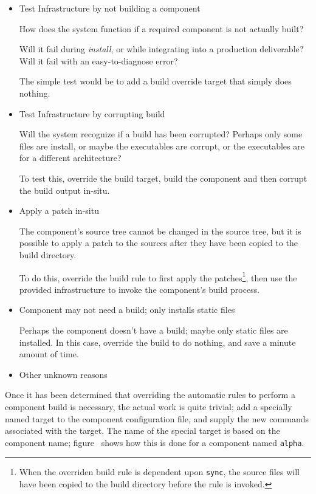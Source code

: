 \begin{itemize}
\item Test \bni Infrastructure by not building a component

  How does the \bni system function if a required component is not
  actually built?

  Will it fail during \emph{install}, or while integrating into a
  production deliverable?  Will it fail with an easy-to-diagnose
  error?

  The simple test would be to add a build override target that simply
  does nothing.

\item Test \bni Infrastructure by corrupting build

  Will the \bni system recognize if a build has been corrupted?
  Perhaps only some files are install, or maybe the executables are
  corrupt, or the executables are for a different architecture?

  To test this, override the build target, build the component and
  then corrupt the build output in-situ.

\item Apply a patch in-situ

  The component's source tree cannot be changed in the source tree,
  but it is possible to apply a patch to the sources after they have
  been copied to the build directory.

  To do this, override the build rule to first apply the
  patches\footnote{When the overriden build rule is dependent upon
    \texttt{sync}, the source files will have been copied to the build
    directory before the rule is invoked.}, then use the provided
  \lmsbw infrastructure to invoke the component's build process.

\item Component may not need a build; only installs static files

  Perhaps the component doesn't have a build; maybe only static files
  are installed.  In this case, override the build to do nothing, and
  save a minute amount of time.

\item Other unknown reasons
\end{itemize}

Once it has been determined that overriding the automatic rules to
perform a component build is necessary, the actual work is quite
trivial; add a specially named \makefile target to the component
configuration file, and supply the new commands associated with the
target.  The name of the special target is based on the component
name; figure~ shows how this
is done for a component named \texttt{alpha}.

